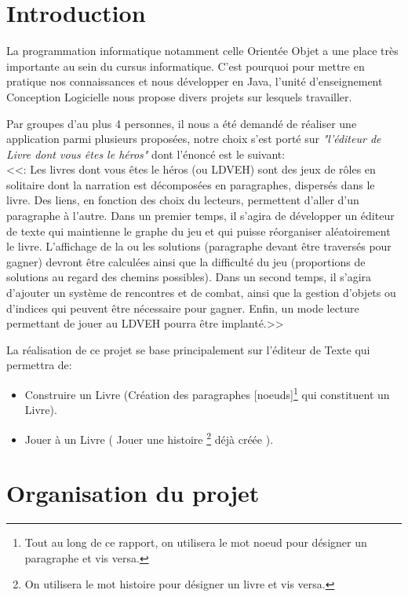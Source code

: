 \documentclass[12pt]{article}
\begin{document}
	\section*{Introduction}
	La programmation informatique notamment celle Orientée Objet a une place très importante au sein du cursus informatique. C'est pourquoi pour mettre en pratique nos connaissances et nous développer  en Java, l'unité d'enseignement Conception Logicielle nous propose divers projets sur lesquels travailler.
	\par Par groupes d'au plus 4 personnes, il nous a été demandé de réaliser une application
	 parmi plusieurs proposées, notre choix s'est porté sur \textit{"l'éditeur de Livre dont vous êtes le héros"} dont l'énoncé est le suivant:\\
	<<: Les livres dont vous êtes le héros (ou LDVEH) sont des jeux de rôles en solitaire dont la
		narration est décomposées en paragraphes, dispersés dans le livre. Des liens, en fonction des 			choix du lecteurs, permettent d’aller d’un paragraphe à l’autre. Dans un premier temps, il s’agira de
	développer un éditeur de texte qui maintienne le graphe du jeu et qui puisse réorganiser
	aléatoirement le livre. L’affichage de la ou les solutions (paragraphe devant être traversés pour
	gagner) devront être calculées ainsi que la difficulté du jeu (proportions de solutions au regard des
	chemins possibles). Dans un second temps, il s’agira d’ajouter un système de rencontres et de
	combat, ainsi que la gestion d’objets ou d’indices qui peuvent être nécessaire pour gagner. Enfin,
	un mode lecture permettant de jouer au LDVEH pourra être implanté.>>
	\par La réalisation de ce projet se base principalement sur l'éditeur de Texte qui permettra de:
	\begin{itemize}
		\item Construire un Livre (Création des paragraphes [noeuds]\footnote{Tout au long de ce rapport, on utilisera le mot noeud pour désigner un paragraphe et vis versa.} qui constituent un Livre).
		\item Jouer à un Livre ( Jouer une histoire \footnote{On utilisera le mot histoire pour désigner un livre et vis versa.} déjà créée   ).
	\end{itemize}
	\newpage
	
		
	

	\section{Organisation du projet}
\end{document}
